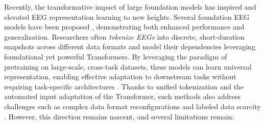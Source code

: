 

Recently, the transformative impact of large foundation models\cite{touvron2023llama,achiam2023gpt} has inspired and elevated EEG representation learning to new heights.
Several foundation EEG models have been proposed \cite{duan2023dewave,yi2024learning,mohammadi2024eeg2rep,yang2024biot}, demonstrating both enhanced performance and generalization.
Researchers often \textit{tokenize EEGs} into discrete, short-duration snapshots across different data formats and model their dependencies leveraging foundational yet powerful Transformers.
By leveraging the paradigm of pretraining on large-scale, cross-task datasets, these models can learn universal representation, enabling effective adaptation to downstream tasks without requiring task-specific architectures \cite{kotoge2024splitsee,mohammadi2024eeg2rep}.
Thanks to unified tokenization and the automated input adaptation of the Transformer, such methods also address challenges such as complex data format reconfigurations \cite{yang2024biot} and labeled data scarcity \cite{jiang2024large}.
However, this direction remains nascent, and several limitations remain:


